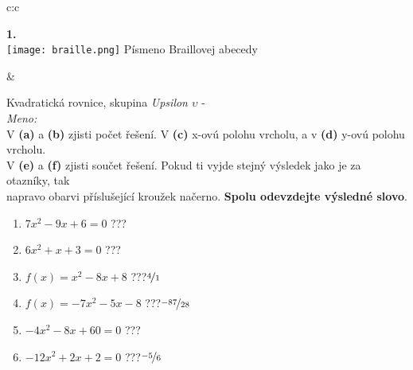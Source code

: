 \documentclass[10pt]{report}
\begin{document}
\begin{tabular}{c:c}
\begin{minipage}[c][99mm][t]{0.49\linewidth}
\begin{center}
\begin{minipage}{0.20\linewidth}
\begin{center}
{\Huge\bfseries 1.} \\[2mm]
\texttt{[image: braille.png]}
{\small Písmeno Braillovej abecedy}
\end{center}
\end{minipage}
\end{center}
\end{minipage}
&
\begin{minipage}[c][99mm][t]{0.49\linewidth}
\begin{center}
\vspace{7mm}
{\huge Kvadratická rovnice, skupina \textit{Upsilon $\upsilon$} -}\\[4.5mm]
\textit{Meno:}\phantom{xxxxxxxxxxxxxxxxxxxxxxxxxxxxxxxxxxxxxxxxxxxxxxxxxxxxxxxxxxxxxxxxx}\\[3.5mm]
V \textbf{(a)} a \textbf{(b)} zjisti počet řešení. V \textbf{(c)} x-ovú polohu vrcholu, a v \textbf{(d)} y-ovú polohu vrcholu.\\V \textbf{(e)} a \textbf{(f)} zjisti součet řešení. Pokud ti vyjde stejný výsledek jako je za otazníky, tak\\napravo obarvi příslušející kroužek načerno. \textbf{Spolu odevzdejte výsledné slovo}.\\[3mm]
\begin{minipage}{0.77\linewidth}
\begin{center}
\begin{varwidth}{\textwidth}
\begin{enumerate}
\large
\item $7x^2-9x+6=0$\quad \dotfill\; ???\;\dotfill {}
\item $6x^2+x+3=0$\quad \dotfill\; ???\;\dotfill {}
\item $f(x)=x^2-8x+8$\quad \dotfill\; ???\;\dotfill \quad $\nicefrac{4}{1}$
\item $f(x)=-7x^2-5x-8$\quad \dotfill\; ???\;\dotfill \quad $\nicefrac{-87}{28}$
\item $-4x^2-8x+60=0$\quad \dotfill\; ???\;\dotfill {}
\item $-12x^2+2x+2=0$\quad \dotfill\; ???\;\dotfill \quad $\nicefrac{-5}{6}$
\end{enumerate}
\end{varwidth}
\end{center}
\end{minipage}
\begin{minipage}{0.20\linewidth}

\end{minipage}
\end{center}
\end{minipage}
\end{tabular}
\end{document}
